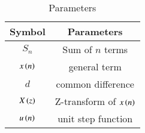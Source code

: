 \setlength{\arrayrulewidth}{0.3mm}
\setlength{\tabcolsep}{15pt}
\renewcommand{\arraystretch}{1.4}

\begin{table}[h]

\centering

\begin{tabular}{|c|c|}
\hline

\textbf{Symbol} & \textbf{Parameters}\\
\hline
$S_n$ & Sum of $n$ terms\\
\hline
$x\left(n\right)$ & general term\\
\hline
$d$ & common difference\\
\hline
$X\left(z\right)$ & Z-transform of $x\left(n\right)$\\
\hline
$u\left(n\right)$ & unit step function\\
\hline

\end{tabular}
\vspace{0.25cm}
\caption{Parameters}
\label{tab:11.9.2.13.1}

\end{table}